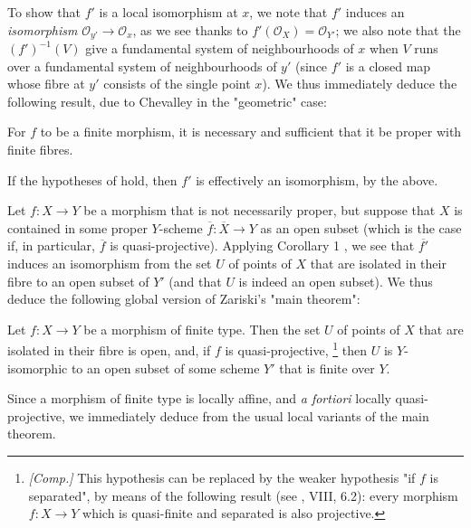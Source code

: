 To show that $f'$ is a local isomorphism at $x$, we note that $f'$ induces an \emph{isomorphism} $\mathcal{O}_{y'}\to\mathcal{O}_x$, as we see thanks to $f'(\mathcal{O}_X)=\mathcal{O}_{Y'}$;
we also note that the $(f')^{-1}(V)$ give a fundamental system of neighbourhoods of $x$ when $V$ runs over a fundamental system of neighbourhoods of $y'$ (since $f'$ is a closed map whose fibre at $y'$ consists of the single point $x$).
We thus immediately deduce the following result, due to Chevalley in the "geometric" case:

\begin{corollary}\label{fga2-theorem-5-corollary-2}
    For $f$ to be a finite morphism, it is necessary and sufficient that it be proper with finite fibres.
\end{corollary}

If the hypotheses of  hold, then $f'$ is effectively an isomorphism, by the above.

Let $f\colon X\to Y$ be a morphism that is not necessarily proper, but suppose that $X$ is contained in some proper $Y$-scheme $\overline{f}\colon\overline{X}\to Y$ as an open subset (which is the case if, in particular, $\overline{f}$ is quasi-projective).
Applying Corollary 1 , we see that $\overline{f'}$ induces an isomorphism from the set $U$ of points of $X$ that are isolated in their fibre to an open subset of $Y'$ (and that $U$ is indeed an open subset).
We thus deduce the following global version of Zariski's "main theorem":

\begin{theorem}\label{fga2-theorem-6}
    Let $f\colon X\to Y$ be a morphism of finite type.
    Then the set $U$ of points of $X$ that are isolated in their fibre is open, and, if $f$ is quasi-projective,
    \footnote{\emph{[Comp.]} This hypothesis can be replaced by the weaker hypothesis "if $f$ is separated", by means of the following result (see \cite{Gro1960b}, VIII, 6.2): every morphism $f\colon X\to Y$ which is quasi-finite and separated is also projective.}
    then $U$ is $Y$-isomorphic to an open subset of some scheme $Y'$ that is finite over $Y$.
\end{theorem}

Since a morphism of finite type is locally affine, and \emph{a fortiori} locally quasi-projective, we immediately deduce from  the usual local variants of the main theorem.
